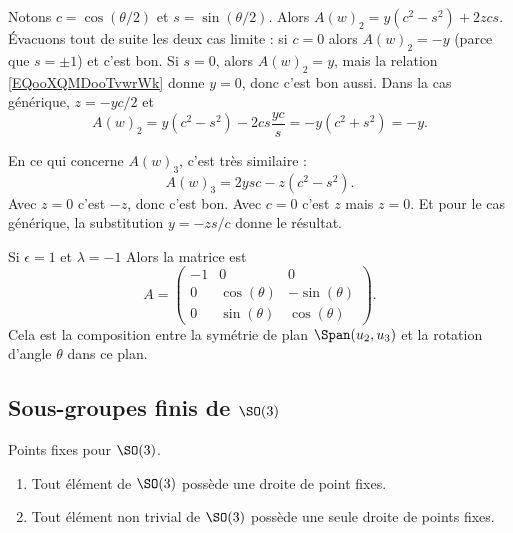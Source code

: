 \begin{subproof}
        Notons \( c=\cos(\theta/2)\) et \( s=\sin(\theta/2)\). Alors \( A(w)_2=y(c^2-s^2)+2zcs\). Évacuons tout de suite les deux cas limite : si \( c=0\) alors \( A(w)_2=-y\) (parce que \( s=\pm1\)) et c'est bon. Si \( s=0\), alors \( A(w)_2=y\), mais la relation \eqref{EQooXQMDooTvwrWk} donne \( y=0\), donc c'est bon aussi. Dans la cas générique, \( z=-yc/2\) et
        \begin{equation}
            A(w)_2=y(c^2-s^2)-2cs\frac{ yc }{ s }=-y(c^2+s^2)=-y.
        \end{equation}

        En ce qui concerne \( A(w)_3\), c'est très similaire :
        \begin{equation}
            A(w)_3=2ysc-z(c^2-s^2).
        \end{equation}
        Avec \( z=0\) c'est \( -z\), donc c'est bon. Avec \( c=0\) c'est \( z\) mais \( z=0\). Et pour le cas générique, la substitution \( y=-zs/c\) donne le résultat.
        

    \item[Si \( \epsilon=1\) et \( \lambda=-1\)] Alors la matrice est
        \begin{equation}
            A=\begin{pmatrix}
                -1    &   0    &   0    \\
                0    &   \cos(\theta)    &   -\sin(\theta)    \\
                0    &   \sin(\theta)    &   \cos(\theta)
            \end{pmatrix}.
        \end{equation}
        Cela est la composition entre la symétrie de plan \( \Span(u_2,u_3)\) et la rotation d'angle \( \theta\) dans ce plan.
\end{subproof}

\subsection{Sous-groupes finis de \( \SO(3)\)}

\begin{lemma}       \label{LEMooWIMMooXOCfSt}
    Points fixes pour \( \SO(3)\).
    \begin{enumerate}
        \item
            Tout élément de \( \SO(3)\) possède une droite de point fixes.
        \item
            Tout élément non trivial de \( \SO(3)\) possède une seule droite de points fixes.
    \end{enumerate}
\end{lemma}

